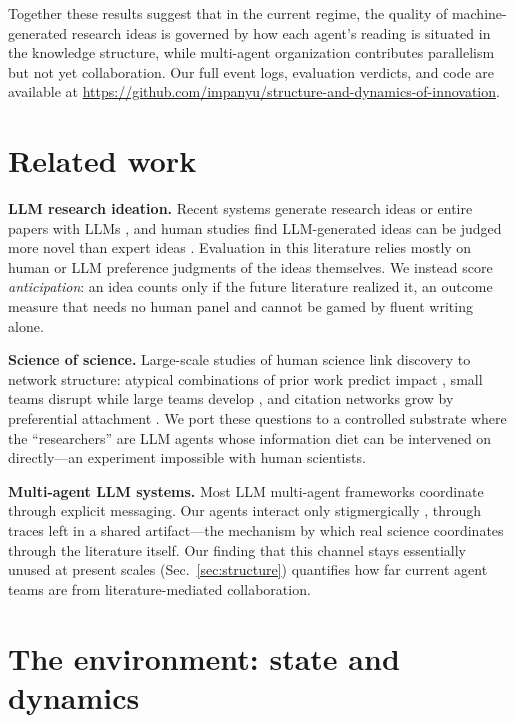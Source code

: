 \documentclass{article} %
\begin{document}
Together these results suggest that in the current regime, the quality of
machine-generated research ideas is governed by how each agent's reading is
situated in the knowledge structure, while multi-agent organization
contributes parallelism but not yet collaboration. Our full event
logs, evaluation verdicts, and code are available at
\url{https://github.com/impanyu/structure-and-dynamics-of-innovation}.

\section{Related work}

\textbf{LLM research ideation.} Recent systems generate research ideas or
entire papers with LLMs \citep{lu2024aiscientist}, and human studies find
LLM-generated ideas can be judged more novel than expert ideas
\citep{si2024llmideas}. Evaluation in this literature relies mostly on
human or LLM preference judgments of the ideas themselves. We instead
score \emph{anticipation}: an idea counts only if the future literature
realized it, an outcome measure that needs no human panel and cannot be
gamed by fluent writing alone.

\textbf{Science of science.} Large-scale studies of human science link
discovery to network structure: atypical combinations of prior work
predict impact \citep{uzzi2013atypical}, small teams disrupt while large
teams develop \citep{wu2019teams}, and citation networks grow by
preferential attachment \citep{barabasi1999emergence,fortunato2018science}.
We port these questions to a controlled substrate where the ``researchers''
are LLM agents whose information diet can be intervened on directly---an
experiment impossible with human scientists.

\textbf{Multi-agent LLM systems.} Most LLM multi-agent frameworks
coordinate through explicit messaging. Our agents interact only
stigmergically \citep{theraulaz1999stigmergy}, through traces left in a
shared artifact---the mechanism by which real science coordinates through
the literature itself. Our finding that this channel stays essentially
unused at present scales (Sec.~\ref{sec:structure}) quantifies how far
current agent teams are from literature-mediated collaboration.

\section{The environment: state and dynamics}
\label{sec:framework}
\end{document}
